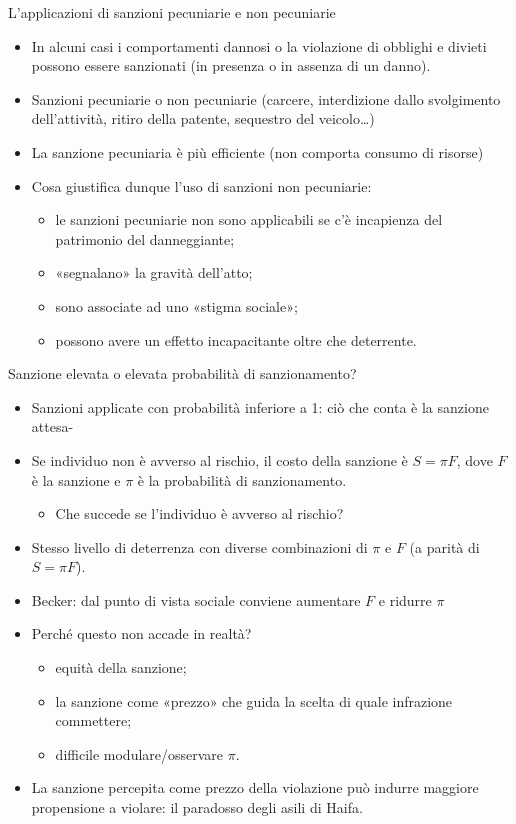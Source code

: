 \documentclass[aspectratio=64,12pt]{beamer}
\begin{document}
\begin{frame}{L'applicazioni di sanzioni pecuniarie e non pecuniarie}
\begin{itemize}
\item In alcuni casi i comportamenti dannosi o la violazione di obblighi e
divieti possono essere sanzionati (in presenza o in assenza di un danno).
\item Sanzioni \alert{pecuniarie} o \alert{non pecuniarie} (carcere,
interdizione dallo svolgimento dell'attività, ritiro della patente, sequestro
del veicolo\ldots{})
\item La sanzione pecuniaria è più \alert{efficiente} (non comporta consumo di
risorse)
\item Cosa giustifica dunque l'uso di sanzioni non pecuniarie:
\begin{itemize}
\item le sanzioni pecuniarie non sono applicabili se c'è incapienza del
patrimonio del danneggiante;
\item «segnalano» la gravità dell'atto;
\item sono associate ad uno «stigma sociale»;
\item possono avere un effetto incapacitante oltre che deterrente.
\end{itemize}
\end{itemize}
\end{frame}

\begin{frame}{Sanzione elevata o elevata probabilità di sanzionamento?}
\begin{itemize}
\item Sanzioni applicate con probabilità inferiore a 1: ciò che conta è la
\alert{sanzione attesa}-
\item Se individuo non è avverso al rischio, il costo della sanzione è $S=\pi
F$, dove $F$ è la sanzione e $\pi$ è la probabilità di sanzionamento.
\begin{itemize}
\item Che succede se l'individuo è avverso al rischio?
\end{itemize}
\item Stesso livello di deterrenza con diverse combinazioni di $\pi$ e $F$ (a
parità di $S=\pi F$).
\item Becker: dal punto di vista sociale conviene aumentare $F$ e ridurre
$\pi$
\item Perché questo non accade in realtà?
\begin{itemize}
\item equità della sanzione;
\item la sanzione come «prezzo» che guida la scelta di quale infrazione
commettere;
\item difficile modulare/osservare $\pi$.
\end{itemize}
\item La sanzione percepita come \alert{prezzo} della violazione può indurre
maggiore propensione a violare: il paradosso degli asili di Haifa.
\end{itemize}
\end{frame}
\end{document}
